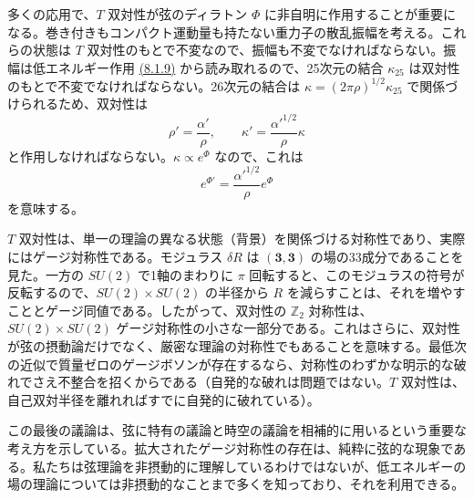 多くの応用で、$T$ 双対性が弦のディラトン $\Phi$ に非自明に作用することが重要になる。巻き付きもコンパクト運動量も持たない重力子の散乱振幅を考える。これらの状態は $T$ 双対性のもとで不変なので、振幅も不変でなければならない。振幅は低エネルギー作用 \hyperref[eq:8.1.9]{(8.1.9)} から読み取れるので、25次元の結合 $\kappa_{25}$ は双対性のもとで不変でなければならない。26次元の結合は $\kappa=(2\pi\rho)^{1/2}\kappa_{25}$ で関係づけられるため、双対性は
\begin{equation}
\rho'=\frac{\alpha'}\rho,\qquad\kappa'=\frac{\alpha'^{1/2}}\rho\kappa
\tag{8.3.30}\label{eq:8.3.30}
\end{equation}
と作用しなければならない。$\kappa\propto e^\Phi$ なので、これは
\begin{equation}
e^{\Phi'}=\frac{\alpha'^{1/2}}\rho e^\Phi
\tag{8.3.31}\label{eq:8.3.31}
\end{equation}
を意味する。

$T$ 双対性は、単一の理論の異なる状態（背景）を関係づける対称性であり、実際にはゲージ対称性である。モジュラス $\delta R$ は $(\mathbf3,\mathbf3)$ の場の33成分であることを見た。一方の $SU(2)$ で1軸のまわりに $\pi$ 回転すると、このモジュラスの符号が反転するので、$SU(2)\times SU(2)$ の半径から $R$ を減らすことは、それを増やすこととゲージ同値である。したがって、双対性の $\mathbb Z_2$ 対称性は、$SU(2)\times SU(2)$ ゲージ対称性の小さな一部分である。これはさらに、双対性が弦の摂動論だけでなく、厳密な理論の対称性でもあることを意味する。最低次の近似で質量ゼロのゲージボソンが存在するなら、対称性のわずかな明示的な破れでさえ不整合を招くからである（自発的な破れは問題ではない。$T$ 双対性は、自己双対半径を離れればすでに自発的に破れている）。

この最後の議論は、弦に特有の議論と時空の議論を相補的に用いるという重要な考え方を示している。拡大されたゲージ対称性の存在は、純粋に弦的な現象である。私たちは弦理論を非摂動的に理解しているわけではないが、低エネルギーの場の理論については非摂動的なことまで多くを知っており、それを利用できる。

\label{sec:8.4}

